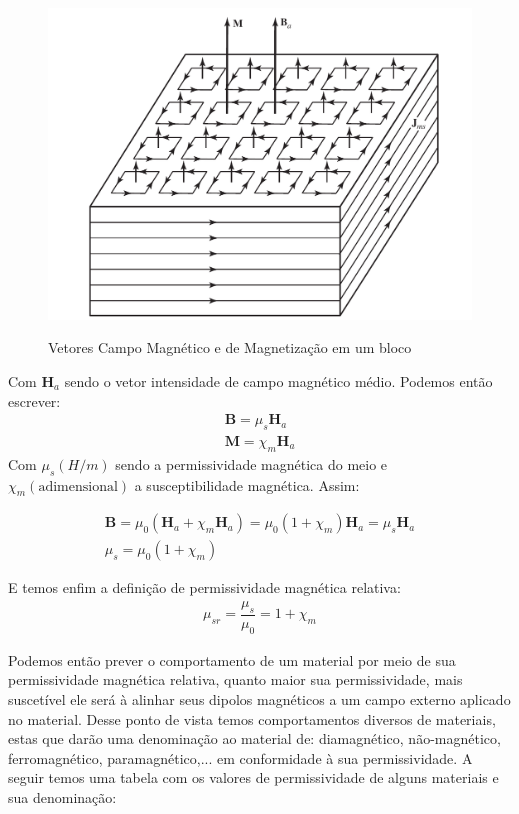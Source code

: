 \documentclass[
        12pt,                           %
        openright,                      %
        twoside,                        %
        a4paper,                        %
        english,                        %
        french,                         %
        spanish,                        %
        brazil                          %
        ]{abntex2}
\begin{document}
\begin{figure}[!htp]
  \centering
  \includegraphics[width=0.7\columnwidth]{balanis.png}
  \label{fig:chap:embasamento:5}
  \caption{Vetores Campo Magnético e de Magnetização em um bloco \cite{book:balanis}}
\end{figure}

Com $\bm{H}_a$ sendo o vetor intensidade de campo magnético médio. Podemos então
escrever:
\begin{gather}
  \bm{B} = \mu_s \bm{H}_a \\
  \bm{M} = \chi_m \bm{H}_a
\end{gather}
Com $\mu_s(H/m)$ sendo a permissividade magnética do meio e $\chi_m(\text{adimensional})$
a susceptibilidade magnética. Assim:

\begin{gather}
  \bm{B} = \mu_0 (\bm{H}_a + \chi_m \bm{H}_a) = \mu_0(1 + \chi_m) \bm{H}_a = \mu_s \bm{H}_a\\
  \mu_s = \mu_0 (1 + \chi_m)
\end{gather}

E temos enfim a definição de permissividade magnética relativa:
\begin{gather}
  \mu_{sr} = \dfrac{\mu_s}{\mu_0} = 1 + \chi_m
\end{gather}

Podemos então prever o comportamento de um material por meio de sua permissividade
magnética relativa, quanto maior sua permissividade, mais suscetível ele será à alinhar
seus dipolos magnéticos a um campo externo aplicado no material. Desse ponto de vista
temos comportamentos diversos de materiais, estas que darão uma denominação ao material
de: diamagnético, não-magnético, ferromagnético, paramagnético,... em conformidade à
sua permissividade. A seguir temos uma tabela com os valores de permissividade de alguns
materiais e sua denominação:
\end{document}
